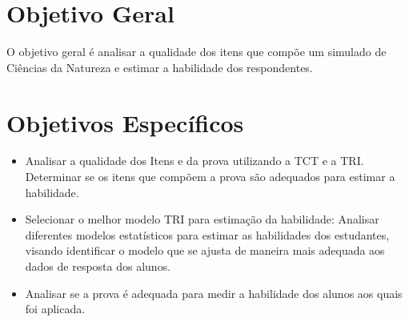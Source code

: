\section{Objetivo Geral}

O objetivo geral é analisar a qualidade dos itens que compõe um simulado de Ciências da Natureza e estimar a habilidade dos respondentes.

\section{Objetivos Específicos}

\begin{itemize}
	
\item Analisar a qualidade dos Itens e da prova utilizando a TCT e a TRI. Determinar se os itens que compõem a prova são adequados para estimar a habilidade.	
	
\item Selecionar o melhor modelo TRI para estimação da habilidade: Analisar diferentes modelos estatísticos para estimar as habilidades dos estudantes, visando identificar o modelo que se ajusta de maneira mais adequada aos dados de resposta dos alunos. 

\item Analisar se a prova é adequada para medir a habilidade dos alunos aos quais foi aplicada.

\begin{comment}
\item Estimar os Parâmetros TRI dos Itens: Investigar os parâmetros de dificuldade, discriminação e chute (acerto casual) das questões presentes na prova, visando compreender suas características de medida e avaliar sua qualidade na avaliação da habilidade dos estudantes. Essa análise permite determinar se algumas questões devem ser descartadas devido à sua baixa qualidade ou se podem compor um banco de itens para avaliações futuras. 


\item Avaliar : Verificar se a prova é unidimensional, ou seja, se está avaliando apenas uma variável latente, assegurando que os itens sejam coesos e estejam medindo a mesma habilidade subjacente. Caso não esteja avaliando a mesma dimensão, avaliar qual a dimensionalidade do teste.
\item Avaliar a Abrangência na faixa da habilidade: Verificar em qual faixa de habilidade o teste se encontra e identificar quais níveis de habilidade precisam de maior representação por meio da inclusão de mais questões.



\item Identificar e definir itens âncoras na prova. Estabelecer escalas interpretáveis de habilidades dos estudantes com base nos itens âncoras, bem como determinar quais questões se enquadram em cada escala.
\end{comment}



\end{itemize}



